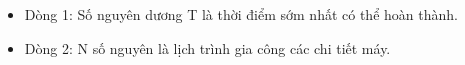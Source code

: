 \begin{itemize}
	\item     Dòng 1: Số nguyên dương T là thời điểm sớm nhất có thể hoàn thành.   
	\item     Dòng 2: N số nguyên là lịch trình gia công các chi tiết máy.   
\end{itemize}

\